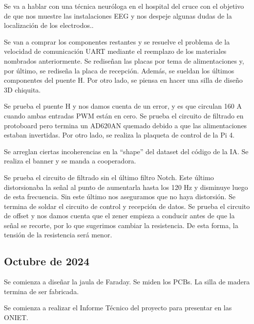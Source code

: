 \documentclass{article}
\begin{document}
Se va a hablar con una técnica neuróloga en el hospital del cruce con el objetivo de que nos muestre las instalaciones EEG y nos despeje algunas dudas de la localización de los electrodos..



Se van a comprar los componentes restantes y se resuelve el problema de la velocidad de comunicación UART mediante el reemplazo de los materiales nombrados anteriormente. Se rediseñan las placas por tema de alimentaciones y, por último, se rediseña la placa de recepción. Además, se sueldan los últimos componentes del puente H. Por otro lado, se piensa en hacer una silla de diseño 3D chiquita.



Se prueba el puente H y nos damos cuenta de un error, y es que circulan 160 A cuando ambas entradas PWM están en cero. Se prueba el circuito de filtrado en protoboard pero termina un AD620AN quemado debido a que las alimentaciones estaban invertidas. Por otro lado, se realiza la plaqueta de control de la Pi 4.



Se arreglan ciertas incoherencias en la “shape” del dataset del código de la IA. Se realiza el banner y se manda a cooperadora.



Se prueba el circuito de filtrado sin el último filtro Notch. Este último distorsionaba la señal al punto de aumentarla hasta los 120 Hz y disminuye luego de esta frecuencia. Sin este último nos aseguramos que no haya distorsión. Se termina de soldar el circuito de control y recepción de datos. Se prueba el circuito de offset y nos damos cuenta que el zener empieza a conducir antes de que la señal se recorte, por lo que sugerimos cambiar la resistencia. De esta forma, la tensión de la resistencia será menor.

\newpage

\begin{center}
    \section{Octubre de 2024}
\end{center}

Se comienza a diseñar la jaula de Faraday. Se miden los PCBs. La silla de madera termina de ser fabricada.



Se comienza a realizar el Informe Técnico del proyecto para presentar en las ONIET.
\end{document}
